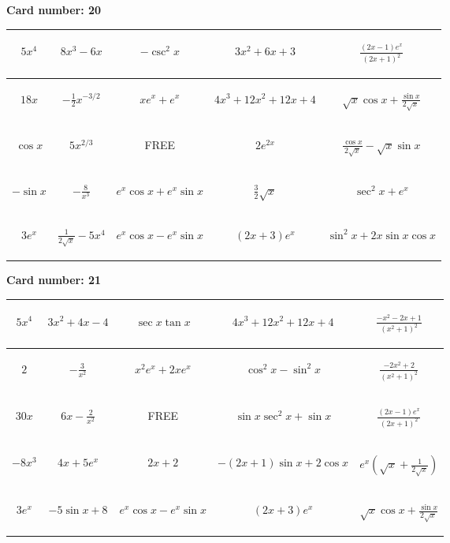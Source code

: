\documentclass{article}
\newcommand{\entry}[1]{\begin{minipage}[t][2.75cm][t]{4cm} \vspace{1cm} \begin{center}#1\end{center} \end{minipage}}
\newcommand{\freespace}{\entry{FREE}}
\newcommand{\cardnumber}[1]{\noindent \textbf{Card number: #1} \bigskip}
\begin{document}
\pagebreak

\cardnumber{20}
\begin{center}
\begin{tabular}{|*{5}{c|}}
    \hline
    \entry{$5x^4$} & \entry{$8x^3 - 6x$} & \entry{$-\csc^2 x$} & \entry{$3x^2 + 6x + 3$} & \entry{$\frac{(2x - 1) e^x}{(2x + 1)^2}$} \\ \hline
    \entry{$18x$} & \entry{$-\frac{1}{2} x^{-3/2}$} & \entry{$x e^x + e^x$} & \entry{$4x^3 + 12x^2 + 12x + 4$} & \entry{$\sqrt{x} \cos x + \frac{\sin x}{2 \sqrt{x}}$} \\ \hline
    \entry{$\cos x$} & \entry{$5x^{2/3}$} & \freespace & \entry{$2e^{2x}$} & \entry{$\frac{\cos x}{2 \sqrt{x}} - \sqrt{x} \sin x$} \\ \hline
    \entry{$-\sin x$} & \entry{$-\frac{8}{x^3}$} & \entry{$e^x \cos x + e^x \sin x$} & \entry{$\frac{3}{2} \sqrt{x}$} & \entry{$\sec^2 x + e^x$} \\ \hline
    \entry{$3e^x$} & \entry{$\frac{1}{2\sqrt{x}} - 5x^4$} & \entry{$e^x \cos x - e^x \sin x$} & \entry{$(2x + 3) e^x$} & \entry{$\sin^2 x + 2x \sin x \cos x$} \\ \hline
\end{tabular}
\end{center}

\pagebreak

\cardnumber{21}
\begin{center}
\begin{tabular}{|*{5}{c|}}
    \hline
    \entry{$5x^4$} & \entry{$3x^2 + 4x - 4$} & \entry{$\sec x \tan x$} & \entry{$4x^3 + 12x^2 + 12x + 4$} & \entry{$\frac{-x^2 - 2x + 1}{(x^2 + 1)^2}$} \\ \hline
    \entry{$2$} & \entry{$-\frac{3}{x^2}$} & \entry{$x^2 e^x + 2x e^x$} & \entry{$\cos^2 x - \sin^2 x$} & \entry{$\frac{-2x^2 + 2}{(x^2 + 1)^2}$} \\ \hline
    \entry{$30x$} & \entry{$6x - \frac{2}{x^2}$} & \freespace & \entry{$\sin x \sec^2 x + \sin x$} & \entry{$\frac{(2x - 1) e^x}{(2x + 1)^2}$} \\ \hline
    \entry{$-8x^3$} & \entry{$4x + 5e^x$} & \entry{$2x + 2$} & \entry{$-(2x + 1) \sin x + 2 \cos x$} & \entry{$e^x \left(\sqrt{x} + \frac{1}{2\sqrt{x}}\right)$} \\ \hline
    \entry{$3e^x$} & \entry{$-5 \sin x + 8$} & \entry{$e^x \cos x - e^x \sin x$} & \entry{$(2x + 3) e^x$} & \entry{$\sqrt{x} \cos x + \frac{\sin x}{2 \sqrt{x}}$} \\ \hline
\end{tabular}
\end{center}
\end{document}
